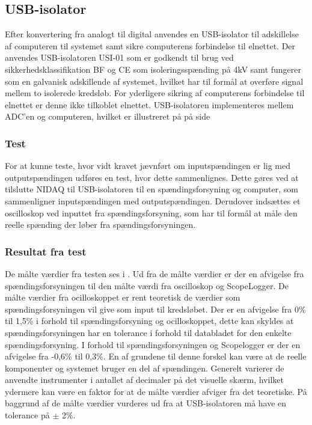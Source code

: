 \subsection{USB-isolator}
Efter konvertering fra analogt til digital anvendes en USB-isolator til adskillelse af computeren til systemet samt sikre computerens forbindelse til elnettet. 
Der anvendes USB-isolatoren USI-01 som er godkendt til brug ved sikkerhedsklassifikation BF og CE som isoleringsspænding på 4kV samt fungerer som en galvanisk adskillende af systemet, hvilket har til formål at overføre signal mellem to isolerede kredsløb. For yderligere sikring af computerens forbindelse til elnettet er denne ikke tilkoblet elnettet. USB-isolatoren implementeres mellem ADC'en og computeren, hvilket er illustreret på  på side \pageref{blokdiagram}

\subsubsection{Test}
For at kunne teste, hvor vidt kravet jævnført \pageref{kravspecifikationer} om inputspændingen er lig med outputspændingen udføres en test, hvor dette sammenlignes. Dette gøres ved at tilslutte NIDAQ til USB-isolatoren til en spændingsforsyning og computer, som sammenligner inputspændingen med outputspændingen. Derudover indsættes et oscilloskop ved inputtet fra spændingsforsyning, som har til formål at måle den reelle spænding der løber fra spændingsforsyningen. 

\subsubsection{Resultat fra test}
De målte værdier fra testen ses i . Ud fra de målte værdier er der en afvigelse fra spændingsforsyningen til den målte værdi fra oscilloskop og ScopeLogger. De målte værdier fra ocilloskoppet er rent teoretisk de værdier som spændingsforsyningen vil give som input til kredsløbet. Der er en afvigelse fra 0\% til 1,5\% i forhold til spændingsforsyning og ocilloskoppet, dette kan skyldes at spændingsforsyningen har en tolerance i forhold til databladet for den enkelte spændingsforsyning. I forhold til spændingsforsyningen og Scopelogger er der en afvigelse fra -0,6\% til 0,3\%. En af grundene til denne forskel kan være at de reelle komponenter og systemet bruger en del af spændingen. Generelt varierer de anvendte instrumenter i antallet af decimaler på det visuelle skærm, hvilket ydermere kan være en faktor for at de målte værdier afviger fra det teoretiske. På baggrund af de målte værdier vurderes ud fra \pageref{kravspecifikationer} at USB-isolatoren må have en tolerance på $\pm$ 2\%.

